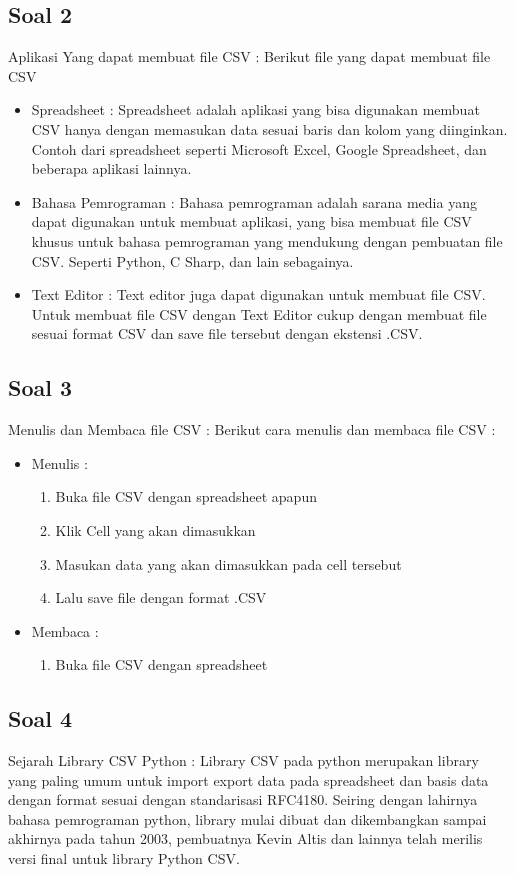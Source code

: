 \subsection{Soal 2}
Aplikasi Yang dapat membuat file CSV : 
Berikut file yang dapat membuat file CSV
\begin{itemize}
	\item Spreadsheet :
	Spreadsheet adalah aplikasi yang bisa digunakan membuat CSV hanya dengan memasukan data sesuai baris dan kolom yang diinginkan. Contoh dari spreadsheet seperti Microsoft Excel, Google Spreadsheet, dan beberapa aplikasi lainnya. 
	\item Bahasa Pemrograman :
	Bahasa pemrograman adalah sarana media yang dapat digunakan untuk membuat aplikasi, yang bisa membuat file CSV khusus untuk bahasa pemrograman yang mendukung dengan pembuatan file CSV. Seperti Python, C Sharp, dan lain sebagainya.
	\item Text Editor :
	Text editor juga dapat digunakan untuk membuat file CSV. Untuk membuat file CSV dengan Text Editor cukup dengan membuat file sesuai format CSV dan save file tersebut dengan ekstensi .CSV.
\end{itemize}
\subsection{Soal 3}
Menulis dan Membaca file CSV : 
Berikut cara menulis dan membaca file CSV : 
\begin{itemize}
	\item Menulis : \begin{enumerate}
						\item Buka file CSV dengan spreadsheet apapun
						\item Klik Cell yang akan dimasukkan
						\item Masukan data yang akan dimasukkan pada cell tersebut
						\item Lalu save file dengan format .CSV
					\end{enumerate}
	\item Membaca : \begin{enumerate}
						\item Buka file CSV dengan spreadsheet						
					\end{enumerate}
\end{itemize}
\subsection{Soal 4}
Sejarah Library CSV Python : 
Library CSV pada python merupakan library yang paling umum untuk import export data pada spreadsheet dan basis data dengan format sesuai dengan standarisasi RFC4180. Seiring dengan lahirnya bahasa pemrograman python, library mulai dibuat dan dikembangkan sampai akhirnya pada tahun 2003, pembuatnya Kevin Altis dan lainnya telah merilis versi final untuk library Python CSV. 
